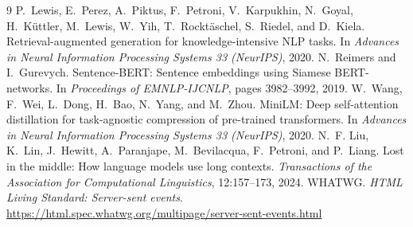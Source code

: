 \documentclass[11pt,a4paper]{article}
\begin{document}
\begin{thebibliography}{9}
 P.~Lewis, E.~Perez, A.~Piktus, F.~Petroni, V.~Karpukhin, N.~Goyal, H.~K\"uttler, M.~Lewis, W.~Yih, T.~Rockt\"aschel, S.~Riedel, and D.~Kiela. Retrieval-augmented generation for knowledge-intensive NLP tasks. In \emph{Advances in Neural Information Processing Systems 33 (NeurIPS)}, 2020.
 N.~Reimers and I.~Gurevych. Sentence-BERT: Sentence embeddings using Siamese BERT-networks. In \emph{Proceedings of EMNLP-IJCNLP}, pages 3982--3992, 2019.
 W.~Wang, F.~Wei, L.~Dong, H.~Bao, N.~Yang, and M.~Zhou. MiniLM: Deep self-attention distillation for task-agnostic compression of pre-trained transformers. In \emph{Advances in Neural Information Processing Systems 33 (NeurIPS)}, 2020.
 N.~F. Liu, K.~Lin, J.~Hewitt, A.~Paranjape, M.~Bevilacqua, F.~Petroni, and P.~Liang. Lost in the middle: How language models use long contexts. \emph{Transactions of the Association for Computational Linguistics}, 12:157--173, 2024.
 WHATWG. \emph{HTML Living Standard: Server-sent events}. \url{https://html.spec.whatwg.org/multipage/server-sent-events.html}
\end{thebibliography}
\end{document}
